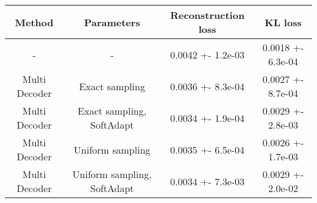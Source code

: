 \centering
\scriptsize
\begin{tabular}{||c|c|c|c||}
\hline
 Method & Parameters & Reconstruction loss & KL loss \\
\hline
- & - & 0.0042 +- 1.2e-03 & 0.0018 +- 6.3e-04 \\
\hline
Multi Decoder & Exact sampling & 0.0036 +- 8.3e-04 & 0.0027 +- 8.7e-04 \\
\hline
Multi Decoder & Exact sampling, SoftAdapt & 0.0034 +- 1.9e-04 & 0.0029 +- 2.8e-03 \\
\hline
Multi Decoder & Uniform sampling & 0.0035 +- 6.5e-04 & 0.0026 +- 1.7e-03 \\
\hline
Multi Decoder & Uniform sampling, SoftAdapt & 0.0034 +- 7.3e-03 & 0.0029 +- 2.0e-02 \\
\hline
\end{tabular}
